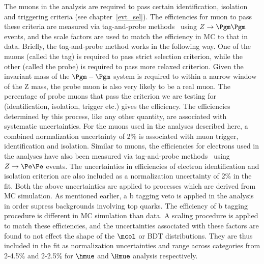 The muons in the analysis are required to pass certain identification, isolation and triggering criteria (see chapter~\ref{evt_sel}). The efficiencies for muon to pass these criteria are measured via tag-and-probe methods~\cite{muon_recon2018} using $Z\rightarrow\Pgm\Pgm$ events, and the scale factors are used to match the efficiency in MC to that in data. Briefly, the tag-and-probe method works in the following way. One of the muons (called the tag) is required to pass strict selection criterion, while the other (called the probe) is required to pass more relaxed criterion. Given the invariant mass of the $\Pgm-\Pgm$ system is required to within a narrow  window of the Z mass, the probe muon is also very likely to be a real muon. The percentage of probe muons that pass the criterion we are testing for (identification, isolation, trigger etc.) gives the  efficiency. The efficiencies determined by this process, like any other quantity, are associated with systematic  uncertainties. For the muons used in the analyses described here, a combined normalization uncertainty of 2\% is associated with muon trigger, identification and isolation. Similar to muons, the efficiencies for electrons used in the analyses have also been measured via tag-and-probe methods~\cite{e_recon} using $Z\rightarrow\Pe\Pe$ events. The uncertainties in efficiencies  of electron identification and isolation criterion are also included as a normalization uncertainty of 2\% in the fit. Both the above uncertainties are applied to processes which are derived from MC simulation. As mentioned earlier, a b tagging veto is applied in the analysis in order supress backgrounds involving top quarks. The efficiency of b tagging procedure is different in MC simulation than data. A scaling procedure is applied to match these efficiencies, and the uncertainties associated with these factors are found to not effect the shape of the $\mcol$ or BDT distributions. They are thus included in the fit as normalization uncertainties and range across categories from 2-4.5\% and 2-2.5\% for $\hmue$ and $\Hmue$ analysis respectively.

